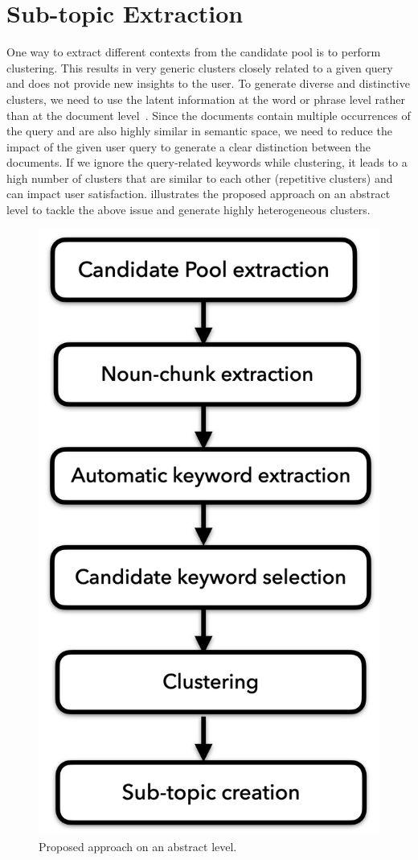 
\chapter{Sub-topic Extraction}

One way to extract different contexts from the candidate pool is to perform clustering. This results in very generic clusters closely related to a given query and does not provide new insights to the user. To generate diverse and distinctive clusters, we need to use the latent information at the word or phrase level rather than at the document level~\cite{blei2003latent}. Since the documents contain multiple occurrences of the query and are also highly similar in semantic space, we need to reduce the impact of the given user query to generate a clear distinction between the documents. If we ignore the query-related keywords while clustering, it leads to a high number of clusters that are similar to each other (repetitive clusters) and can impact user satisfaction.  illustrates the proposed approach on an abstract level to tackle the above issue and generate highly heterogeneous clusters.


\begin{figure}[h]
	\centering
	\includegraphics[width=.35\textwidth]{images/thesis_images/methodology.png}
	\caption{Proposed approach on an abstract level. \label{fig:methodology2}}
\end{figure}

